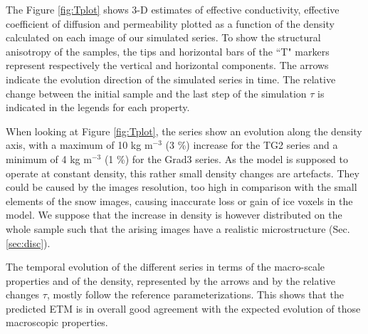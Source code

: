 \documentclass[draft,ms]{agujournal2019}
\begin{document}
The Figure \ref{fig:Tplot} shows 3-D estimates of effective conductivity, effective coefficient of diffusion and permeability plotted as a function of the density calculated on each image of our simulated series. To show the structural anisotropy of the samples, the tips and horizontal bars of the ``T" markers represent respectively the vertical and horizontal components. The arrows indicate the evolution direction of the simulated series in time. The relative change between the initial sample and the last step of the simulation $\tau$ is indicated in the legends for each property.
 
When looking at Figure \ref{fig:Tplot}, the series show an evolution along the density axis, with a maximum of 10 kg m$^{-3}$ (3 \%) increase for the TG2 series and a minimum of 4 kg m$^{-3}$ (1 \%) for the Grad3 series. As the model is supposed to operate at constant density, this rather small density changes are artefacts. They could be caused by the images resolution, too high in comparison with the small elements of the snow images, causing inaccurate loss or gain of ice voxels in the model. We suppose that the increase in density is however distributed on the whole sample such that the arising images have a realistic microstructure (Sec. \ref{sec:disc}).

The temporal evolution of the different series in terms of the macro-scale properties and of the density, represented by the arrows and by the relative changes $\tau$, mostly follow the reference parameterizations. This shows that the predicted ETM is in overall good agreement with the expected evolution of those macroscopic properties. 
\end{document}
